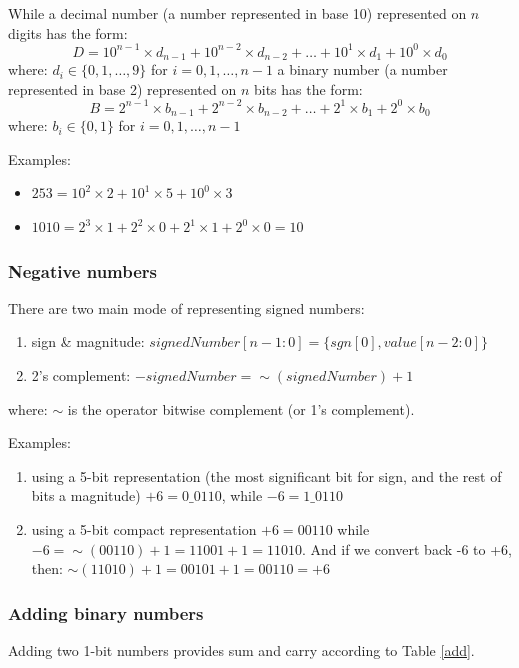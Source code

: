While a decimal number (a number represented in base 10) represented on $n$ digits has the form:
$$D = 10^{n-1} \times d_{n-1} + 10^{n-2} \times d_{n-2} + \ldots + 10^{1} \times d_{1} + 10^{0} \times d_{0}$$
where: $d_i \in \{0, 1, \ldots, 9\}$ for $i = 0, 1, \ldots, n-1$
a binary number (a number represented in base 2) represented on $n$ bits has the form:
$$B = 2^{n-1} \times b_{n-1} + 2^{n-2} \times b_{n-2} + \ldots + 2^{1} \times b_{1} + 2^{0} \times b_{0}$$
where: $b_i \in \{0, 1\}$ for $i = 0, 1, \ldots, n-1$

Examples:
\begin{itemize}
    \item $253 = 10^2 \times 2 + 10^1 \times 5 + 10^0 \times 3$
    \item $1010 = 2^3 \times 1 + 2^2 \times 0 + 2^1 \times 1 + 2^0 \times 0 = 10$
\end{itemize}

\subsubsection{Negative numbers}

There are two main mode of representing signed numbers:
\begin{enumerate}
    \item sign \& magnitude: $signedNumber[n-1:0] = \{sgn[0], value[n-2:0] \}$
    \item 2's complement: $- signedNumber = \sim(signedNumber) + 1$
\end{enumerate}
where: $\sim$ is the operator bitwise complement (or 1's complement).

Examples:
\begin{enumerate}
    \item using a 5-bit representation (the most significant bit for sign, and the rest of bits a magnitude) $+6 = 0\_0110$, while $-6 = 1\_0110$
    \item using a 5-bit compact representation $+6 = 00110$ while $-6 = \sim(00110) + 1 = 11001 + 1 = 11010$. And if we convert back -6 to +6, then: $\sim(11010) + 1 = 00101 + 1 = 00110 = +6$
\end{enumerate}

\subsubsection{Adding binary numbers}

Adding two 1-bit numbers provides sum and carry according to Table \ref{add}.

